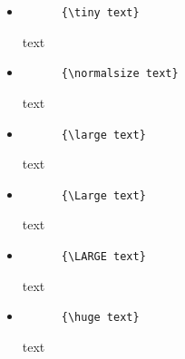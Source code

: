 \documentclass[a4paper,12pt]{article}
\begin{document}
\begin{itemize}
  \renewcommand\labelitemi{}
  \item
  \begin{minipage}[t]{.46\linewidth}
    \begin{verbatim}
      {\tiny text}
    \end{verbatim}
  \end{minipage} \hfill
  \begin{minipage}[t]{.46\linewidth}
    {\tiny text}
  \end{minipage}
  \item
  \begin{minipage}[t]{.46\linewidth}
    \begin{verbatim}
      {\normalsize text}
    \end{verbatim}
  \end{minipage} \hfill
  \begin{minipage}[t]{.46\linewidth}
    {\normalsize text}
  \end{minipage}
  \item
  \begin{minipage}[t]{.46\linewidth}
    \begin{verbatim}
      {\large text}
    \end{verbatim}
  \end{minipage} \hfill
  \begin{minipage}[t]{.46\linewidth}
    {\large text}
  \end{minipage}
  \item
  \begin{minipage}[t]{.46\linewidth}
    \begin{verbatim}
      {\Large text}
    \end{verbatim}
  \end{minipage} \hfill
  \begin{minipage}[t]{.46\linewidth}
    {\Large text}
  \end{minipage}
  \item
  \begin{minipage}[t]{.46\linewidth}
    \begin{verbatim}
      {\LARGE text}
    \end{verbatim}
  \end{minipage} \hfill
  \begin{minipage}[t]{.46\linewidth}
    {\LARGE text}
  \end{minipage}
  \item
  \begin{minipage}[t]{.46\linewidth}
    \begin{verbatim}
      {\huge text}
    \end{verbatim}
  \end{minipage} \hfill
  \begin{minipage}[t]{.46\linewidth}
    {\huge text}
  \end{minipage}
\end{itemize}
\end{document}
